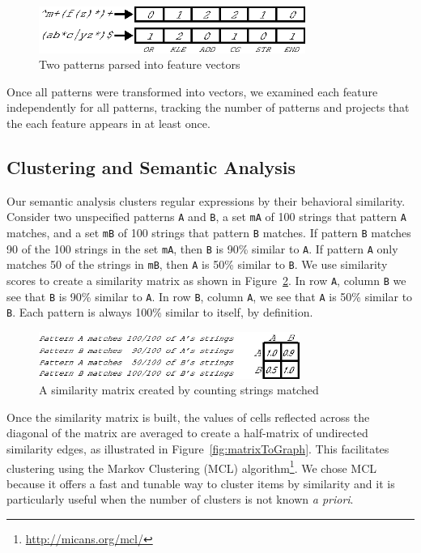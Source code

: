 \begin{figure}[tb]
\centering
\includegraphics[height=0.6in]{../illustrations/featureParsing.eps}
\caption{Two patterns parsed into feature vectors}
\label{fig:featureParsing}
\end{figure}

Once all patterns were transformed into vectors, we examined each feature independently for all patterns, tracking the number of patterns and  projects that the each feature appears in at least once.

\subsection{Clustering and Semantic Analysis}
Our semantic analysis clusters regular expressions by their behavioral similarity.
Consider two unspecified patterns {\tt A} and {\tt B}, a set {\tt mA} of 100 strings that pattern {\tt A} matches, and a set {\tt mB} of 100 strings that pattern {\tt B} matches.
If pattern {\tt B} matches 90 of the 100 strings in the set {\tt mA}, then {\tt B} is 90\% similar to {\tt A}.
If pattern {\tt A} only matches 50 of the strings in {\tt mB}, then {\tt A} is 50\% similar to {\tt B}.
We use similarity scores to create a similarity matrix as shown in Figure~\ref{fig:minimalMatrix}.
In row {\tt A}, column {\tt B} we see that {\tt B} is 90\% similar to {\tt A}.
In row {\tt B}, column {\tt A}, we see that {\tt A} is 50\% similar to {\tt B}.  Each pattern is always 100\% similar to itself, by definition.


\begin{figure}[tb]
\centering
\includegraphics[height=0.6in]{../illustrations/minimalMatrix.eps}
\caption{A similarity matrix created by counting strings matched}
\label{fig:minimalMatrix}
\end{figure}

Once the similarity matrix is built, the values of cells reflected across the diagonal of the matrix are averaged to create a half-matrix of undirected similarity edges, as illustrated in Figure~\ref{fig:matrixToGraph}.
This facilitates clustering using the  Markov Clustering (MCL) algorithm\footnote{\url{http://micans.org/mcl/}}.
We chose MCL  because it offers a fast and tunable way to cluster items by similarity and it is particularly useful when the number of clusters is not known \emph{a priori}.


